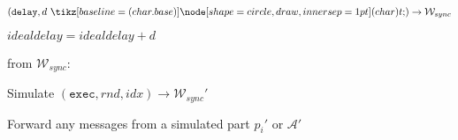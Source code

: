 \begin{bbox}[title={Simulator $\mathcal{S}_{bracha} (\mathcal{D}, \mathcal{P}, \Delta)$}]
\begin{renumerate}
	\item \Send $(\texttt{delay}, d \token) \rightarrow \mathcal{W}_{sync}$

	\item $idealdelay = idealdelay + d$
	\end{renumerate}

\OnInput {} from $\mathcal{W}_{sync}$:
	\begin{renumerate}
	\item Simulate $(\texttt{exec}, rnd, idx) \rightarrow \mathcal{W}_{sync}'$

	\item Forward any messages from a simulated part $p_i'$ or $\mathcal{A}'$
	\end{renumerate}

\end{bbox}
